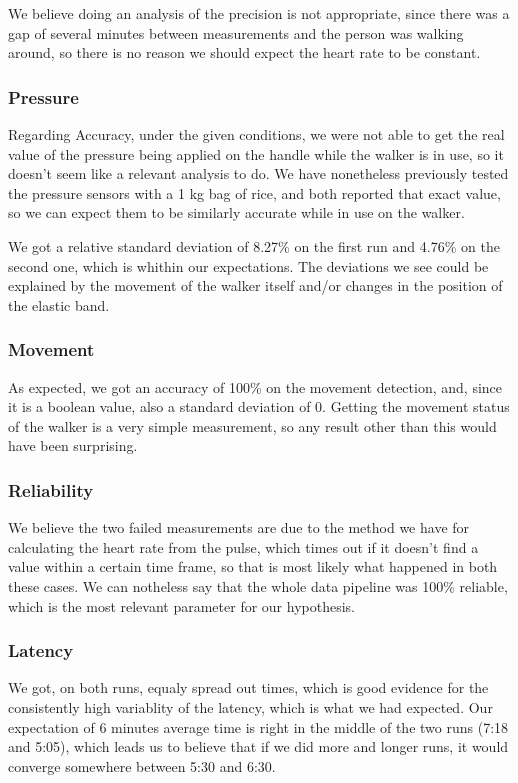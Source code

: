 			We believe doing an analysis of the precision is not appropriate, since there was a gap of several minutes between measurements and the person was walking around, so there is no reason we should expect the heart rate to be constant.

		\subsubsection{Pressure}
			Regarding Accuracy, under the given conditions, we were not able to get the real value of the pressure being applied on the handle while the walker is in use, so it doesn't seem like a relevant analysis to do. We have nonetheless previously tested the pressure sensors with a 1 kg bag of rice, and both reported that exact value, so we can expect them to be similarly accurate while in use on the walker.

			We got a relative standard deviation of 8.27\% on the first run and 4.76\% on the second one, which is whithin our expectations. The deviations we see could be explained by the movement of the walker itself and/or changes in the position of the elastic band.

		\subsubsection{Movement}
			As expected, we got an accuracy of 100\% on the movement detection, and, since it is a boolean value, also a standard deviation of 0. Getting the movement status of the walker is a very simple measurement, so any result other than this would have been surprising.

		\subsubsection{Reliability}
			We believe the two failed measurements are due to the method we have for calculating the heart rate from the pulse, which times out if it doesn't find a value within a certain time frame, so that is most likely what happened in both these cases. We can notheless say that the whole data pipeline was 100\% reliable, which is the most relevant parameter for our hypothesis.

		\subsubsection{Latency}
			We got, on both runs, equaly spread out times, which is good evidence for the consistently high variablity of the latency, which is what we had expected. Our expectation of 6 minutes average time is right in the middle of the two runs (7:18 and 5:05), which leads us to believe that if we did more and longer runs, it would converge somewhere between 5:30 and 6:30.

